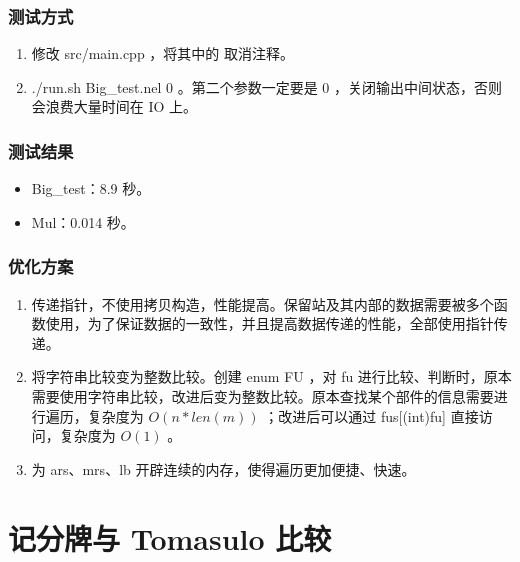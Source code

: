 \documentclass{article}
\begin{document}
\subsubsection{测试方式}




\begin{enumerate}
\item
修改 src/main.cpp ，将其中的  取消注释。
\item
./run.sh Big\_test.nel 0 。第二个参数一定要是 0 ，关闭输出中间状态，否则会浪费大量时间在 IO 上。
\end{enumerate}



\subsubsection{测试结果}




\begin{itemize}
\item
Big\_test：8.9 秒。
\item
Mul：0.014 秒。
\end{itemize}



\subsubsection{优化方案}




\begin{enumerate}
\item
传递指针，不使用拷贝构造，性能提高。保留站及其内部的数据需要被多个函数使用，为了保证数据的一致性，并且提高数据传递的性能，全部使用指针传递。
\item
将字符串比较变为整数比较。创建 enum FU ，对 fu 进行比较、判断时，原本需要使用字符串比较，改进后变为整数比较。原本查找某个部件的信息需要进行遍历，复杂度为  $O(n * len(m))$  ；改进后可以通过 fus{[}(int)fu{]} 直接访问，复杂度为  $O(1)$  。
\item
为 ars、mrs、lb 开辟连续的内存，使得遍历更加便捷、快速。
\end{enumerate}



\section{记分牌与 Tomasulo 比较}
\end{document}
